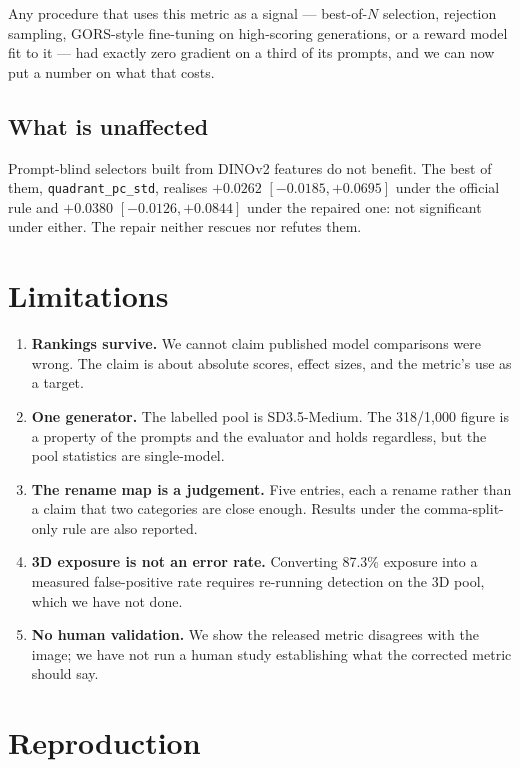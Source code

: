 \documentclass[11pt,a4paper]{article}
\newcommand{\code}[1]{\texttt{\small #1}}
\begin{document}
Any procedure that uses this metric as a signal --- best-of-$N$ selection, rejection sampling,
GORS-style fine-tuning on high-scoring generations, or a reward model fit to it --- had exactly zero
gradient on a third of its prompts, and we can now put a number on what that costs.

\subsection{What is unaffected}
Prompt-blind selectors built from DINOv2 features do not benefit. The best of them,
\code{quadrant\_pc\_std}, realises $+0.0262$ $[-0.0185,+0.0695]$ under the official rule and
$+0.0380$ $[-0.0126,+0.0844]$ under the repaired one: not significant under either. The repair
neither rescues nor refutes them.

\section{Limitations}

\begin{enumerate}\setlength{\itemsep}{2pt}
\item \textbf{Rankings survive.} We cannot claim published model comparisons were wrong. The claim is
about absolute scores, effect sizes, and the metric's use as a target.
\item \textbf{One generator.} The labelled pool is SD3.5-Medium. The 318/1{,}000 figure is a property
of the prompts and the evaluator and holds regardless, but the pool statistics are single-model.
\item \textbf{The rename map is a judgement.} Five entries, each a rename rather than a claim that two
categories are close enough. Results under the comma-split-only rule are also reported.
\item \textbf{3D exposure is not an error rate.} Converting 87.3\% exposure into a measured
false-positive rate requires re-running detection on the 3D pool, which we have not done.
\item \textbf{No human validation.} We show the released metric disagrees with the image; we have not
run a human study establishing what the corrected metric should say.
\end{enumerate}

\section{Reproduction}
\end{document}
